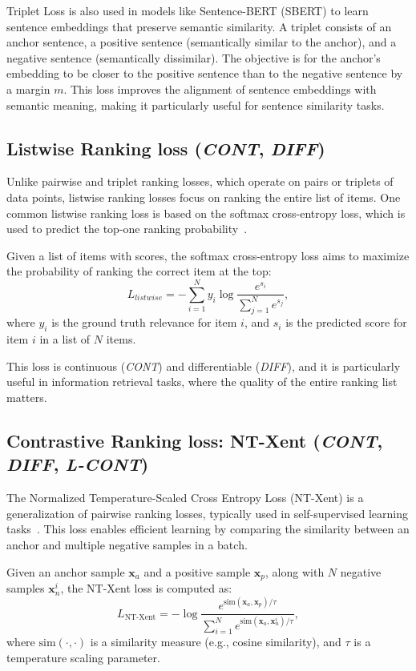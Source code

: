 \documentclass[sn-mathphys-num]{sn-jnl}%
\newcommand \cont{\textit{CONT}}
\newcommand \lcont{\textit{L-CONT}}
\newcommand \diff{\textit{DIFF}}
\renewcommand\vec{\mathbf}
\begin{document}
Triplet Loss is also used in models like Sentence-BERT (SBERT) \cite{reimers2019sentence} to learn sentence embeddings that preserve semantic similarity. A triplet consists of an anchor sentence, a positive sentence (semantically similar to the anchor), and a negative sentence (semantically dissimilar). The objective is for the anchor’s embedding to be closer to the positive sentence than to the negative sentence by a margin \( m \). This loss improves the alignment of sentence embeddings with semantic meaning, making it particularly useful for sentence similarity tasks.
 


\subsection{Listwise Ranking loss (\cont, \diff)}
Unlike pairwise and triplet ranking losses, which operate on pairs or triplets of data points, listwise ranking losses focus on ranking the entire list of items. One common listwise ranking loss is based on the softmax cross-entropy loss, which is used to predict the top-one ranking probability~\cite{cao2007learning}.

Given a list of items with scores, the softmax cross-entropy loss aims to maximize the probability of ranking the correct item at the top:
\begin{equation}
    L_{listwise} = - \sum_{i=1}^{N} y_i \log \frac{e^{s_i}}{\sum_{j=1}^{N} e^{s_j}},
\end{equation}
where $y_i$ is the ground truth relevance for item $i$, and $s_i$ is the predicted score for item $i$ in a list of $N$ items.

This loss is continuous (\cont) and differentiable (\diff), and it is particularly useful in information retrieval tasks, where the quality of the entire ranking list matters.

\subsection{Contrastive Ranking loss: NT-Xent (\cont, \diff, \lcont)}\label{sec:contrastive-ranking-loss}
The Normalized Temperature-Scaled Cross Entropy Loss (NT-Xent) is a generalization of pairwise ranking losses, typically used in self-supervised learning tasks~\cite{chen2020simple}. This loss enables efficient learning by comparing the similarity between an anchor and multiple negative samples in a batch.

Given an anchor sample $\vec{x}_a$ and a positive sample $\vec{x}_p$, along with $N$ negative samples $\vec{x}_n^i$, the NT-Xent loss is computed as:
\begin{equation}
    L_{\text{NT-Xent}} = - \log \frac{e^{\text{sim}(\vec{x}_a, \vec{x}_p) / \tau}}{\sum_{i=1}^{N} e^{\text{sim}(\vec{x}_a, \vec{x}_n^i) / \tau}},
\end{equation}
where $\text{sim}(\cdot, \cdot)$ is a similarity measure (e.g., cosine similarity), and $\tau$ is a temperature scaling parameter.
\end{document}
